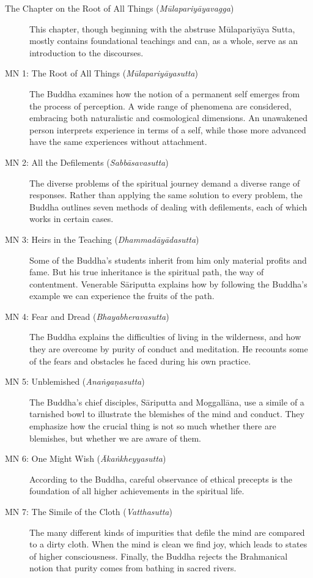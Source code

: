 \documentclass[12pt,openany]{book}%
\begin{document}
\begin{description}%
\item[The Chapter on the Root of All Things (\textit{\textsanskrit{Mūlapariyāyavagga}})] This chapter, though beginning with the abstruse \textsanskrit{Mūlapariyāya} Sutta, mostly contains foundational teachings and can, as a whole, serve as an introduction to the discourses.%
\item[MN 1: The Root of All Things (\textit{\textsanskrit{Mūlapariyāyasutta}})] The Buddha examines how the notion of a permanent self emerges from the process of perception. A wide range of phenomena are considered, embracing both naturalistic and cosmological dimensions. An unawakened person interprets experience in terms of a self, while those more advanced have the same experiences without attachment.%
\item[MN 2: All the Defilements (\textit{\textsanskrit{Sabbāsavasutta}})] The diverse problems of the spiritual journey demand a diverse range of responses. Rather than applying the same solution to every problem, the Buddha outlines seven methods of dealing with defilements, each of which works in certain cases.%
\item[MN 3: Heirs in the Teaching (\textit{\textsanskrit{Dhammadāyādasutta}})] Some of the Buddha’s students inherit from him only material profits and fame. But his true inheritance is the spiritual path, the way of contentment. Venerable \textsanskrit{Sāriputta} explains how by following the Buddha’s example we can experience the fruits of the path.%
\item[MN 4: Fear and Dread (\textit{\textsanskrit{Bhayabheravasutta}})] The Buddha explains the difficulties of living in the wilderness, and how they are overcome by purity of conduct and meditation. He recounts some of the fears and obstacles he faced during his own practice.%
\item[MN 5: Unblemished (\textit{\textsanskrit{Anaṅgaṇasutta}})] The Buddha’s chief disciples, \textsanskrit{Sāriputta} and \textsanskrit{Moggallāna}, use a simile of a tarnished bowl to illustrate the blemishes of the mind and conduct. They emphasize how the crucial thing is not so much whether there are blemishes, but whether we are aware of them.%
\item[MN 6: One Might Wish (\textit{\textsanskrit{Ākaṅkheyyasutta}})] According to the Buddha, careful observance of ethical precepts is the foundation of all higher achievements in the spiritual life.%
\item[MN 7: The Simile of the Cloth (\textit{\textsanskrit{Vatthasutta}})] The many different kinds of impurities that defile the mind are compared to a dirty cloth. When the mind is clean we find joy, which leads to states of higher consciousness. Finally, the Buddha rejects the Brahmanical notion that purity comes from bathing in sacred rivers.%

\end{description}
\end{document}
